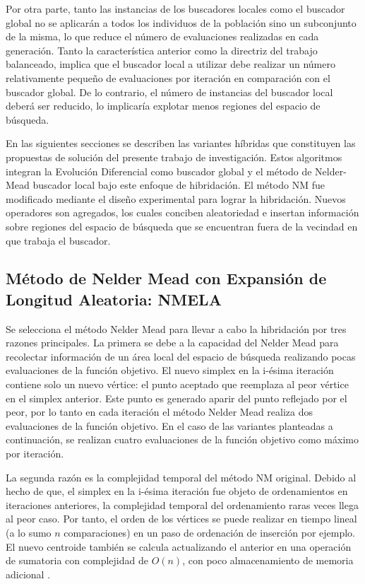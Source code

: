 Por otra parte, tanto las instancias de los buscadores locales como el buscador global no se aplicarán a todos los individuos de la población sino un subconjunto de la misma, lo que reduce el número de evaluaciones realizadas en cada generación. Tanto la característica anterior como la directriz del trabajo balanceado, implica que el buscador local a utilizar debe realizar un número relativamente pequeño de evaluaciones por iteración en comparación con el buscador global. De lo contrario, el número de instancias del buscador local deberá ser reducido, lo implicaría explotar menos regiones del espacio de búsqueda. 

En las siguientes secciones se describen las variantes híbridas que constituyen las propuestas de solución del presente trabajo de investigación. Estos algoritmos integran la Evolución Diferencial como buscador global y el método de Nelder-Mead buscador local bajo este enfoque de hibridación. El método NM fue modificado mediante el diseño experimental para lograr la hibridación. Nuevos operadores son agregados, los cuales conciben aleatoriedad e insertan información sobre regiones del espacio de búsqueda que se encuentran fuera de la vecindad en que trabaja el buscador.

\subsection{Método de Nelder Mead con Expansión de Longitud Aleatoria: NMELA} \label{sec:NMELA}
Se selecciona el método Nelder Mead para llevar a cabo la hibridación por tres razones principales. La primera se debe a la capacidad del Nelder Mead para recolectar información de un área local del espacio de búsqueda realizando pocas evaluaciones de la función objetivo. El nuevo simplex en la i-ésima iteración contiene solo un nuevo vértice: el punto aceptado que reemplaza al peor vértice en el simplex anterior. Este punto es generado aparir del punto reflejado por el peor, por lo tanto en cada iteración el método Nelder Mead realiza dos evaluaciones de la función objetivo. En el caso de las variantes planteadas a continuación, se realizan cuatro evaluaciones de la función objetivo como máximo por iteración. 

La segunda razón es la complejidad temporal del método NM original. Debido al hecho de que, el simplex en la  i-ésima iteración fue objeto de ordenamientos en iteraciones anteriores, la complejidad temporal del ordenamiento raras veces llega al peor caso. Por tanto, el orden de los vértices se puede realizar en tiempo lineal (a lo sumo $n$ comparaciones) en un paso de ordenación de inserción por ejemplo. El nuevo centroide también se calcula actualizando el anterior en una operación de sumatoria con complejidad de $O(n)$, con poco almacenamiento de memoria adicional \cite{Singer2018}. 

